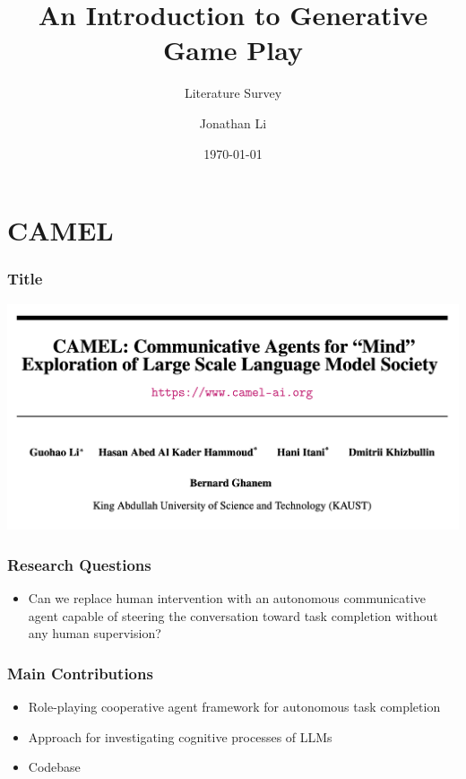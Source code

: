 \documentclass[xcolor=dvipsnames]{beamer}
\newcommand{\0}{\vec{0}}
\begin{document}
	\title{An Introduction to Generative Game Play}
	\subtitle{Literature Survey}
	\author{Jonathan Li}
	\date{\today\\
	} 
	
	\frame{\titlepage}
	
	
	\section{CAMEL}
	
	\begin{frame}
		\frametitle{Title}
		\begin{center}
			\includegraphics[width=\textwidth]{li0}
		\end{center}
	\end{frame}
	
	\begin{frame}
		\frametitle{Research Questions
		}
		\begin{itemize}
			\item Can we replace human intervention with an autonomous communicative agent capable of steering the conversation toward task completion without any human supervision?
		\end{itemize}
	\end{frame}

	\begin{frame}
		\frametitle{Main Contributions
		}
		\begin{itemize}
			\item Role-playing cooperative agent framework for autonomous task completion
			\item Approach for investigating cognitive processes of LLMs
			\item Codebase
		\end{itemize}
	\end{frame}
\end{document}
